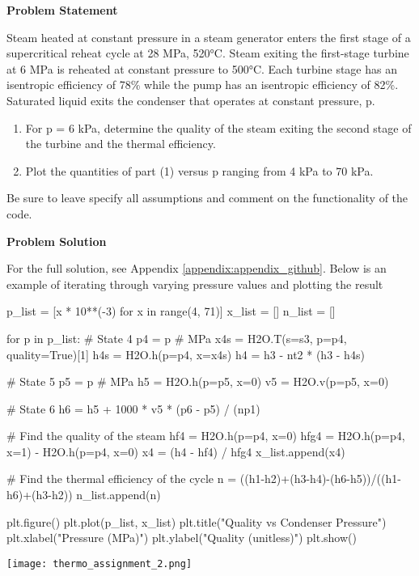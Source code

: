 \begin{tcolorbox}[breakable, enhanced jigsaw, title=ME 513: Assignment \ref{thermo_assignment_2}, 
    colframe=blue!70!white, colback=gray!20]

    \textbf{Problem Statement}

    Steam heated at constant pressure in a steam generator enters the first stage of a
    supercritical reheat cycle at 28 MPa, 520°C. Steam exiting the first-stage turbine at 6 MPa is
    reheated at constant pressure to 500°C. Each turbine stage has an isentropic efficiency of 78\%
    while the pump has an isentropic efficiency of 82\%. Saturated liquid exits the condenser that
    operates at constant pressure, p.

    \begin{enumerate}
        \item For p = 6 kPa, determine the quality of the steam exiting the second stage of the 
        turbine and the thermal efficiency.
        \item Plot the quantities of part (1) versus p ranging from 4 kPa to 70 kPa.
    \end{enumerate}

    Be sure to leave specify all assumptions and comment on the functionality of the code. 

    \tcblower
    \textbf{Problem Solution}

    For the full solution, see Appendix \ref{appendix:appendix_github}. Below is an example of 
    iterating through varying pressure values and plotting the result

    \begin{python}
    p_list = [x * 10**(-3) for x in range(4, 71)]
    x_list = []
    n_list = []

    for p in p_list:
        # State 4
        p4 = p # MPa
        x4s = H2O.T(s=s3, p=p4, quality=True)[1]
        h4s = H2O.h(p=p4, x=x4s)
        h4 = h3 - nt2 * (h3 - h4s)

        # State 5
        p5 = p # MPa
        h5 = H2O.h(p=p5, x=0)
        v5 = H2O.v(p=p5, x=0)

        # State 6
        h6 = h5 + 1000 * v5 * (p6 - p5) / (np1)

        # Find the quality of the steam
        hf4 = H2O.h(p=p4, x=0)
        hfg4 = H2O.h(p=p4, x=1) - H2O.h(p=p4, x=0)
        x4 = (h4 - hf4) / hfg4
        x_list.append(x4)

        # Find the thermal efficiency of the cycle
        n = ((h1-h2)+(h3-h4)-(h6-h5))/((h1-h6)+(h3-h2))
        n_list.append(n)

    plt.figure()
    plt.plot(p_list, x_list)
    plt.title("Quality vs Condenser Pressure")
    plt.xlabel("Pressure (MPa)")
    plt.ylabel("Quality (unitless)")
    plt.show()
    \end{python}
    \texttt{[image: thermo\_assignment\_2.png]}
\end{tcolorbox}

